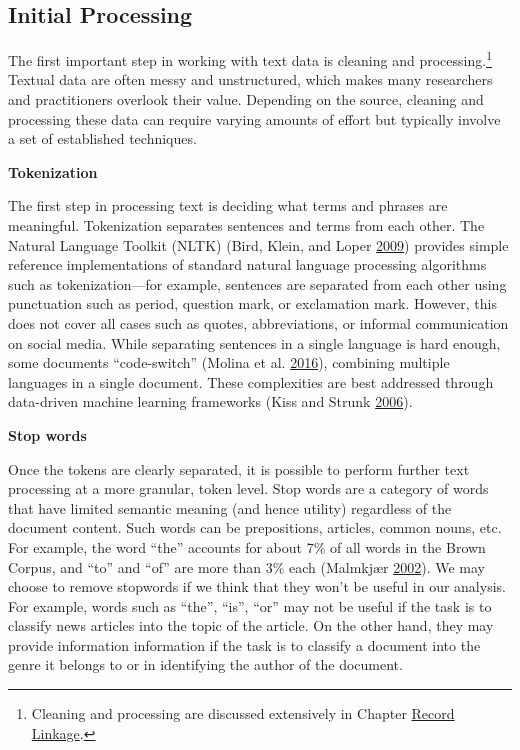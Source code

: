 \documentclass[]{krantz}
\begin{document}
\subsection{Initial Processing}\label{initial-processing}

The first important step in working with text data is cleaning and
processing.\footnote{Cleaning and processing are discussed extensively
  in Chapter \protect\hyperlink{chap:link}{Record Linkage}.} Textual
data are often messy and unstructured, which makes many researchers and
practitioners overlook their value. Depending on the source, cleaning
and processing these data can require varying amounts of effort but
typically involve a set of established techniques.

\textbf{Tokenization}

The first step in processing text is deciding what terms and phrases are
meaningful. Tokenization separates sentences and terms from each other.
The Natural Language Toolkit (NLTK) (Bird, Klein, and Loper
\protect\hyperlink{ref-bird-09}{2009}) provides simple reference
implementations of standard natural language processing algorithms such
as tokenization---for example, sentences are separated from each other
using punctuation such as period, question mark, or exclamation mark.
However, this does not cover all cases such as quotes, abbreviations, or
informal communication on social media. While separating sentences in a
single language is hard enough, some documents ``code-switch'' (Molina
et al. \protect\hyperlink{ref-molina-16}{2016}), combining multiple
languages in a single document. These complexities are best addressed
through data-driven machine learning frameworks (Kiss and Strunk
\protect\hyperlink{ref-kiss-06}{2006}).

\textbf{Stop words}

Once the tokens are clearly separated, it is possible to perform further
text processing at a more granular, token level. Stop words are a
category of words that have limited semantic meaning (and hence utility)
regardless of the document content. Such words can be prepositions,
articles, common nouns, etc. For example, the word ``the'' accounts for
about 7\% of all words in the Brown Corpus, and ``to'' and ``of'' are
more than 3\% each (Malmkjær \protect\hyperlink{ref-malmkjar-02}{2002}).
We may choose to remove stopwords if we think that they won't be useful
in our analysis. For example, words such as ``the'', ``is'', ``or'' may
not be useful if the task is to classify news articles into the topic of
the article. On the other hand, they may provide information information
if the task is to classify a document into the genre it belongs to or in
identifying the author of the document.
\end{document}
